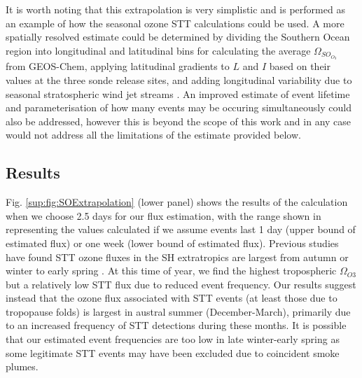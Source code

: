     It is worth noting that this extrapolation is very simplistic and is performed as an example of how the seasonal ozone STT calculations could be used.
    A more spatially resolved estimate could be determined by dividing the Southern Ocean region into longitudinal and latitudinal bins for calculating the average $\Omega_{SO_{O_3}}$ from GEOS-Chem, applying latitudinal gradients to $L$ and $I$ based on their values at the three sonde release sites, and adding longitudinal variability due to seasonal stratospheric wind jet streams \citep{Baray2012,Skerlak2015}.
    An improved estimate of event lifetime and parameterisation of how many events may be occuring simultaneously could also be addressed, however this is beyond the scope of this work and in any case would not address all the limitations of the estimate provided below.

  \subsection{Results}
    
    Fig. \ref{sup:fig:SOExtrapolation} (lower panel) shows the results of the calculation when we choose 2.5 days for our flux estimation, with the range shown in representing the values calculated if we assume events last 1 day (upper bound of estimated flux) or one week (lower bound of estimated flux).
    Previous studies have found STT ozone fluxes in the SH extratropics are largest from autumn or winter to early spring \citep{Olsen2003, Liu2016}.
    At this time of year, we find the highest tropospheric $\Omega_{O3}$ but a relatively low STT flux due to reduced event frequency.
    Our results suggest instead that the ozone flux associated with STT events (at least those due to tropopause folds) is largest in austral summer (December-March), primarily due to an increased frequency of STT detections during these months.
    It is possible that our estimated event frequencies are too low in late winter-early spring as some legitimate STT events may have been excluded due to coincident smoke plumes.
    
